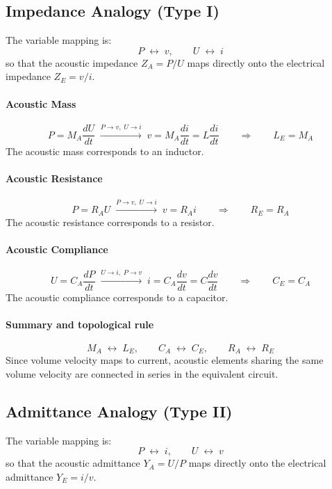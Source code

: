 \subsection{Impedance Analogy (Type I)}
\label{ssc:321}

The variable mapping is:
\[
P \;\leftrightarrow\; v, \qquad U \;\leftrightarrow\; i
\]
so that the acoustic impedance \(Z_A = P/U\) maps directly onto the electrical impedance \(Z_E = v/i\).

\paragraph{Acoustic Mass}
\[
P = M_A\frac{dU}{dt}
\;\xrightarrow{P\to v,\;U\to i}\;
v = M_A\frac{di}{dt} = L\frac{di}{dt}
\qquad\Longrightarrow\qquad
L_E = M_A
\]
The acoustic mass corresponds to an inductor.

\paragraph{Acoustic Resistance}
\[
P = R_A U
\;\xrightarrow{P\to v,\;U\to i}\;
v = R_A i
\qquad\Longrightarrow\qquad
R_E = R_A
\]
The acoustic resistance corresponds to a resistor.

\paragraph{Acoustic Compliance}
\[
U = C_A\frac{dP}{dt}
\;\xrightarrow{U\to i,\;P\to v}\;
i = C_A\frac{dv}{dt} = C\frac{dv}{dt}
\qquad\Longrightarrow\qquad
C_E = C_A
\]
The acoustic compliance corresponds to a capacitor.

\paragraph{Summary and topological rule}
\[
M_A \;\leftrightarrow\; L_E,
\qquad C_A \;\leftrightarrow\; C_E,
\qquad R_A \;\leftrightarrow\; R_E
\]
Since volume velocity maps to current, acoustic elements sharing the same volume velocity are connected in series in the equivalent circuit.

\subsection{Admittance Analogy (Type II)}
\label{ssc:322}

The variable mapping is:
\[
P \;\leftrightarrow\; i, \qquad U \;\leftrightarrow\; v
\]
so that the acoustic admittance \(Y_A = U/P\) maps directly onto the electrical admittance \(Y_E = i/v\).

